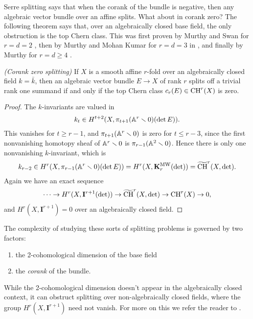 \documentclass[11pt,openany]{book}
\providecommand{\KMW}{\mathbf{K}^\mathrm{MW}}
\providecommand{\CHW}{\widetilde{\mathrm{CH}}}
\begin{document}
Serre splitting says that when the corank of the bundle is negative, then any algebraic vector bundle over an affine splits. What about in corank zero? The following theorem says that, over an algebraically closed base field, the only obstruction is the top Chern class. This was first proven by Murthy and Swan for $r=d=2$ \cite{MurthySwan}, then by Murthy and Mohan Kumar for $r=d=3$ in \cite{KumarMurthy}, and finally by Murthy for $r=d\ge4$ \cite{Murthy94}.


\begin{theorem} \textit{(Corank zero splitting)} If $X$ is a smooth affine $r$-fold over an algebraically closed field $k = \bar{k}$, then an algebraic vector bundle $E \to X$ of rank $r$ splits off a trivial rank one summand if and only if the top Chern class $c_r(E) \in \mathrm{CH}^r(X)$ is zero.
\end{theorem}
\begin{proof} The $k$-invariants are valued in
\begin{align*}
    k_t \in H^{t+2}(X, \pi_{t+1}(\mathbb{A}^r\smallsetminus 0)(\det E)).
\end{align*}
This vanishes for $t\ge r-1$, and $\pi_{t+1}(\mathbb{A}^r\smallsetminus 0)$ is zero for $t \le r-3$, since the first nonvanishing homotopy sheaf of $\mathbb{A}^r\smallsetminus 0$ is $\pi_{r-1}(\mathbb{A}^2\smallsetminus 0)$. Hence there is only one nonvanishing $k$-invariant, which is
\begin{align*}
    k_{r-2} \in H^{r}(X, \pi_{r-1}(\A^r\minus 0)(\det E)) = H^r(X,\KMW_r(\det)) = \CHW^r(X,\det).
\end{align*}
%
Again we have an exact sequence
\begin{align*}
    \cdots \to H^r(X,\mathbf{I}^{r+1}(\det)) \to \CHW^r(X,\det) \to \CH^r(X) \to 0,
\end{align*}
and $H^r(X,\mathbf{I}^{r+1}) = 0$ over an algebraically closed field.
\end{proof}


The complexity of studying these sorts of splitting problems is governed by two factors:
\begin{enumerate}
    \item the 2-cohomological dimension of the base field
    \item the \textit{corank} of the bundle.
\end{enumerate}

While the 2-cohomological dimension doesn't appear in the algebraically closed context, it can obstruct splitting over non-algebraically closed fields, where the group $H^r(X,\mathbf{I}^{r+1})$ need not vanish. For more on this we refer the reader to \cite{AF2}.
\end{document}
